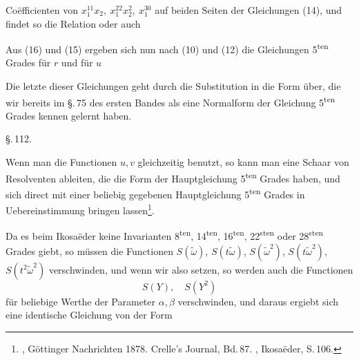 
Co\"efficienten von $x_1^{11}x_2,\ x_1^{22}x_2^2,\ x_1^{30}$ auf beiden Seiten der Gleichungen (14), und findet so die Relation
oder auch

Aus (16) und (15) ergeben sich nun nach (10) und (12) die Gleichungen 5\textsuperscript{ten} Grades f\"ur $r$ und f\"ur $u$

Die letzte dieser Gleichungen geht durch die Substitution
in die Form
\"uber, die wir bereits im \S.\,75 des ersten Bandes als eine Normalform der Gleichung 5\textsuperscript{ten} Grades kennen gelernt haben.

\begin{center}
\S.\,112.\\[4pt]
\end{center}

Wenn man die Functionen $u, v$ gleichzeitig benutzt, so kann man eine Schaar von Resolventen ableiten, die die Form der Hauptgleichung 5\textsuperscript{ten} Grades haben, und sich direct mit einer beliebig gegebenen Hauptgleichung 5\textsuperscript{ten} Grades in Uebereinstimmung bringen lassen\footnote{, G\"ottinger Nachrichten 1878. Crelle's Journal, Bd.\,87. , Ikosa\"eder, S.\,106.}.

Da es beim Ikosa\"eder keine Invarianten 8\textsuperscript{ten}, 14\textsuperscript{ten}, 16\textsuperscript{ten}, 22\textsuperscript{sten} oder 28\textsuperscript{sten} Grades giebt, so m\"ussen die Functionen $S(\tilde\omega)$, $S(t\tilde\omega)$, $S(\tilde\omega^2)$, $S(t\tilde\omega^2)$, $S(t^2\tilde\omega^2)$ verschwinden, und wenn wir also
setzen, so werden auch die Functionen
\[ S(Y),\quad S(Y^2) \]
f\"ur beliebige Werthe der Parameter $\alpha, \beta$ verschwinden, und daraus ergiebt sich eine identische Gleichung von der Form
